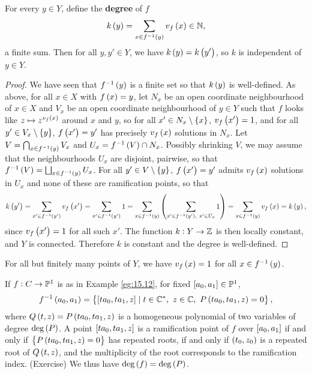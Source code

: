 
\begin{lemma}
For every $ y \in Y $, define the \textbf{degree} of $ f $
$$ k\br{y} = \sum_{x \in f^{-1}\br{y}} v_f\br{x} \in \N, $$
a finite sum. Then for all $ y, y' \in Y $, we have $ k\br{y} = k\br{y'} $, so $ k $ is independent of $ y \in Y $.
\end{lemma}

\begin{proof}
We have seen that $ f^{-1}\br{y} $ is a finite set so that $ k\br{y} $ is well-defined. As above, for all $ x \in X $ with $ f\br{x} = y $, let $ N_x $ be an open coordinate neighbourhood of $ x \in X $ and $ V_x $ be an open coordinate neighbourhood of $ y \in Y $ such that $ f $ looks like $ z \mapsto z^{v_f\br{x}} $ around $ x $ and $ y $, so for all $ x' \in N_x \setminus \cbr{x} $, $ v_f\br{x'} = 1 $, and for all $ y' \in V_x \setminus \cbr{y} $, $ f\br{x'} = y' $ has precisely $ v_f\br{x} $ solutions in $ N_x $. Let $ V = \bigcap_{x \in f^{-1}\br{y}} V_x $ and $ U_x = f^{-1}\br{V} \cap N_x $. Possibly shrinking $ V $, we may assume that the neighbourhoods $ U_x $ are disjoint, pairwise, so that $ f^{-1}\br{V} = \bigsqcup_{x \in f^{-1}\br{y}} U_x $. For all $ y' \in V \setminus \cbr{y} $, $ f\br{x'} = y' $ admits $ v_f\br{x} $ solutions in $ U_x $ and none of these are ramification points, so that
$$ k\br{y'} = \sum_{x' \in f^{-1}\br{y'}} v_f\br{x'} = \sum_{x' \in f^{-1}\br{y'}} 1 = \sum_{x \in f^{-1}\br{y}} \br{\sum_{x' \in f^{-1}\br{y'}, \ x' \in U_x} 1} = \sum_{x \in f^{-1}\br{y}} v_f\br{x} = k\br{y}, $$
since $ v_f\br{x'} = 1 $ for all such $ x' $. The function $ k : Y \to \Z $ is then locally constant, and $ Y $ is connected. Therefore $ k $ is constant and the degree is well-defined.
\end{proof}

\begin{remark*}
For all but finitely many points of $ Y $, we have $ v_f\br{x} = 1 $ for all $ x \in f^{-1}\br{y} $.
\end{remark*}

\begin{example}
\label{eg:17.14}
If $ f : C \to \P^1 $ is as in Example \ref{eg:15.12}, for fixed $ \sbr{a_0, a_1} \in \P^1 $,
$$ f^{-1}\br{a_0, a_1} = \cbr{\sbr{ta_0, ta_1, z} \mid t \in \C^*, \ z \in \C, \ P\br{ta_0, ta_1, z} = 0}, $$
where $ Q\br{t, z} = P\br{ta_0, ta_1, z} $ is a homogeneous polynomial of two variables of degree $ \deg\br{P} $. A point $ \sbr{ta_0, ta_1, z} $ is a ramification point of $ f $ over $ \sbr{a_0, a_1} $ if and only if $ \cbr{P\br{ta_0, ta_1, z} = 0} $ has repeated roots, if and only if $ \br{t_0, z_0} $ is a repeated root of $ Q\br{t, z} $, and the multiplicity of the root corresponds to the ramification index. (Exercise) We thus have $ \deg\br{f} = \deg\br{P} $.
\end{example}

